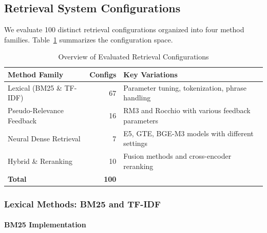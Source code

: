 \documentclass[preprint,12pt]{elsarticle}
\begin{document}
\subsection{Retrieval System Configurations}

We evaluate 100 distinct retrieval configurations organized into four method families. Table~\ref{tab:method_families} summarizes the configuration space.

\begin{table}[ht]
\centering
\caption{Overview of Evaluated Retrieval Configurations}
\label{tab:method_families}
\begin{tabular}{|l|r|p{6cm}|}
\hline
\textbf{Method Family} & \textbf{Configs} & \textbf{Key Variations} \\
\hline
Lexical (BM25 \& TF-IDF) & 67 & Parameter tuning, tokenization, phrase handling \\
Pseudo-Relevance Feedback & 16 & RM3 and Rocchio with various feedback parameters \\
Neural Dense Retrieval & 7 & E5, GTE, BGE-M3 models with different settings \\
Hybrid \& Reranking & 10 & Fusion methods and cross-encoder reranking \\
\hline
\textbf{Total} & \textbf{100} & \\
\hline
\end{tabular}
\end{table}

\subsubsection{Lexical Methods: BM25 and TF-IDF}
\label{subsec:lexical_methods}

\paragraph{BM25 Implementation}
\end{document}
